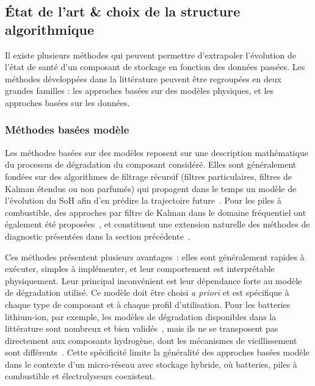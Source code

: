 \subsection{État de l'art \& choix de la structure algorithmique}

Il existe plusieurs méthodes qui peuvent permettre d'extrapoler l'évolution de l'état de santé d'un composant de stockage en fonction des données passées. Les méthodes développées dans la littérature peuvent être regroupées en deux grandes familles : les approches basées sur des modèles physiques, et les approches basées sur les données.

\subsubsection{Méthodes basées modèle}

Les méthodes basées sur des modèles reposent sur une description mathématique du processus de dégradation du composant considéré. Elles sont généralement fondées sur des algorithmes de filtrage récursif (filtres particulaires, filtres de Kalman étendus ou non parfumés) qui propagent dans le temps un modèle de l'évolution du SoH afin d'en prédire la trajectoire future~\cite{kim_novel_2021}\cite{ahwiadi_enhanced_2022}. Pour les piles à combustible, des approches par filtre de Kalman dans le domaine fréquentiel ont également été proposées~\cite{ao_proton_2021}, et constituent une extension naturelle des méthodes de diagnostic présentées dans la section précédente~\cite{bressel_extended_2016}.

Ces méthodes présentent plusieurs avantages~: elles sont généralement rapides à exécuter, simples à implémenter, et leur comportement est interprétable physiquement. Leur principal inconvénient est leur dépendance forte au modèle de dégradation utilisé. Ce modèle doit être choisi \textit{a priori} et est spécifique à chaque type de composant et à chaque profil d'utilisation. Pour les batteries lithium-ion, par exemple, les modèles de dégradation disponibles dans la littérature sont nombreux et bien validés~\cite{vetter_ageing_2005}\cite{noura_review_2020}, mais ils ne se transposent pas directement aux composants hydrogène, dont les mécanismes de vieillissement sont différents~\cite{dubau_review_2014}\cite{papakonstantinou_degradation_2020}. Cette spécificité limite la généralité des approches basées modèle dans le contexte d'un micro-réseau avec stockage hybride, où batteries, piles à combustible et électrolyseurs coexistent.

